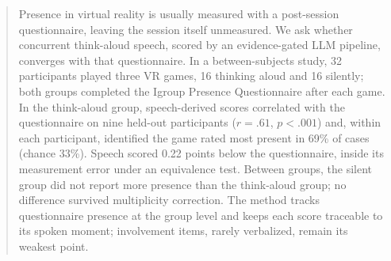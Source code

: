 \begin{abstract}
Presence in virtual reality is usually measured with a post-session questionnaire, leaving the session itself unmeasured. We ask whether concurrent think-aloud speech, scored by an evidence-gated LLM pipeline, converges with that questionnaire. In a between-subjects study, 32 participants played three VR games, 16 thinking aloud and 16 silently; both groups completed the Igroup Presence Questionnaire after each game. In the think-aloud group, speech-derived scores correlated with the questionnaire on nine held-out participants ($r=.61$, $p<.001$) and, within each participant, identified the game rated most present in 69\% of cases (chance 33\%). Speech scored 0.22 points below the questionnaire, inside its measurement error under an equivalence test. Between groups, the silent group did not report more presence than the think-aloud group; no difference survived multiplicity correction. The method tracks questionnaire presence at the group level and keeps each score traceable to its spoken moment; involvement items, rarely verbalized, remain its weakest point.
\end{abstract} 

